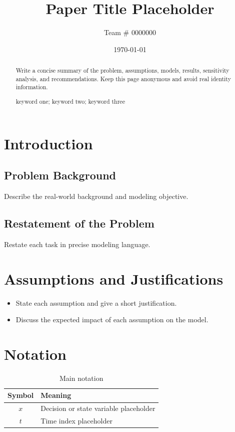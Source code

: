 \documentclass{mcmthesis}
\title{Paper Title Placeholder}
\author{Team \# 0000000}
\date{\today}
\begin{document}
\begin{abstract}
Write a concise summary of the problem, assumptions, models, results, sensitivity analysis, and recommendations. Keep this page anonymous and avoid real identity information.

\begin{keywords}
keyword one; keyword two; keyword three
\end{keywords}
\end{abstract}

\maketitle

\tableofcontents
\newpage

\section{Introduction}
\subsection{Problem Background}
Describe the real-world background and modeling objective.

\subsection{Restatement of the Problem}
Restate each task in precise modeling language.

\section{Assumptions and Justifications}
\begin{itemize}
  \item State each assumption and give a short justification.
  \item Discuss the expected impact of each assumption on the model.
\end{itemize}

\section{Notation}
\begin{table}[htbp]
  \centering
  \caption{Main notation}
  \begin{tabular}{cl}
    \toprule
    Symbol & Meaning \\
    \midrule
    $x$ & Decision or state variable placeholder \\
    $t$ & Time index placeholder \\
    \bottomrule
  \end{tabular}
\end{table}
\end{document}
